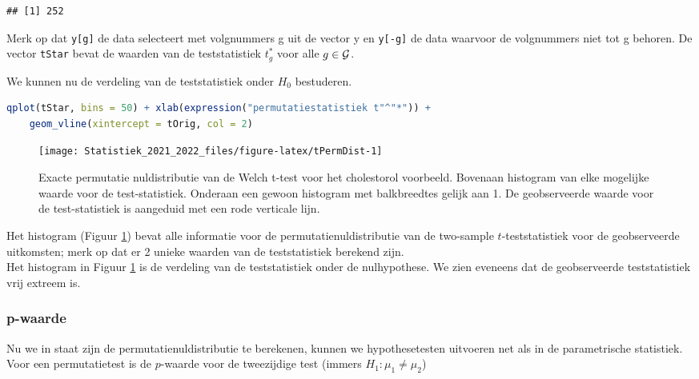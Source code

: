 \documentclass[
  12pt,dutch,coursenotes]{book}
\newcommand{\passthrough}[1]{#1}
\theoremstyle{definition}
\theoremstyle{definition}
\theoremstyle{definition}
\theoremstyle{definition}
\theoremstyle{remark}
\begin{document}
\begin{lstlisting}
## [1] 252
\end{lstlisting}

Merk op dat \passthrough{\lstinline!y[g]!} de data selecteert met volgnummers g uit de vector y en \passthrough{\lstinline!y[-g]!} de data waarvoor de volgnummers niet tot g behoren.
De vector \passthrough{\lstinline!tStar!} bevat de waarden van de teststatistiek \(t^*_g\) voor alle \(g \in {\cal{G}}\).

We kunnen nu de verdeling van de teststatistiek onder \(H_0\) bestuderen.

\begin{lstlisting}[language=R]
qplot(tStar, bins = 50) + xlab(expression("permutatiestatistiek t"^"*")) +
    geom_vline(xintercept = tOrig, col = 2)
\end{lstlisting}

\begin{figure}

{\centering \texttt{[image: Statistiek\_2021\_2022\_files/figure-latex/tPermDist-1]} 

}

\caption{Exacte permutatie nuldistributie van de Welch t-test voor het cholestorol voorbeeld. Bovenaan histogram van elke mogelijke waarde voor de test-statistiek. Onderaan een gewoon histogram met balkbreedtes gelijk aan 1. De geobserveerde waarde voor de test-statistiek is aangeduid met een rode verticale lijn.}\label{fig:tPermDist}
\end{figure}

Het histogram (Figuur \ref{fig:tPermDist}) bevat alle informatie voor de permutatienuldistributie van de two-sample \(t\)-teststatistiek voor de geobserveerde uitkomsten; merk op dat er 2 unieke waarden van de teststatistiek berekend zijn.\\
Het histogram in Figuur \ref{fig:tPermDist} is de verdeling van de teststatistiek onder de nulhypothese.
We zien eveneens dat de geobserveerde teststatistiek vrij extreem is.

\hypertarget{p-waarde}{%
\subsubsection{p-waarde}\label{p-waarde}}

Nu we in staat zijn de permutatienuldistributie te berekenen, kunnen we hypothesetesten uitvoeren net als in de parametrische statistiek.
Voor een permutatietest is de \(p\)-waarde voor de tweezijdige test (immers \(H_1: \mu_1 \neq \mu_2\))
\end{document}

